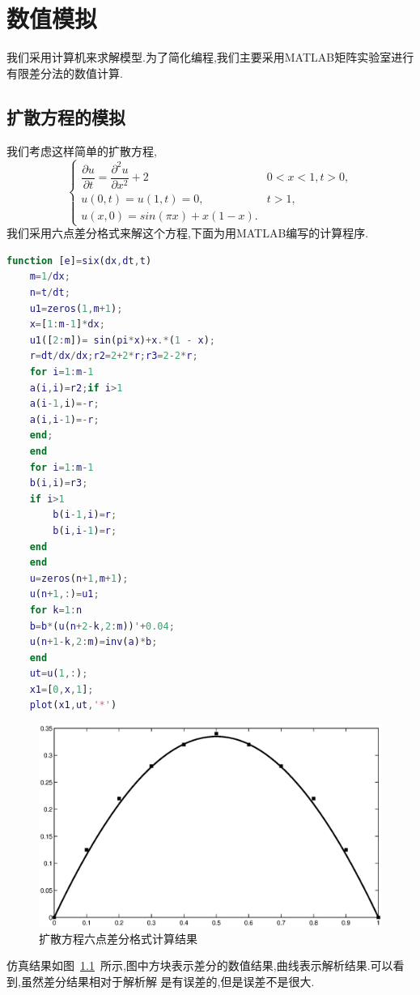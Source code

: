 \chapter{数值模拟}
我们采用计算机来求解模型.为了简化编程,我们主要采用MATLAB矩阵实验室进行有限差分法的数值计算.\par
\section{扩散方程的模拟}
我们考虑这样简单的扩散方程,
\begin{equation}
\begin{cases}
\dfrac{\partial u}{\partial t}=\dfrac{\partial^2 u}{\partial x^2}+2 & 0<x<1,t>0, \\
u(0,t)=u(1,t)=0,& t>1, \\
u(x,0)=sin(\pi x)+x(1-x).
\end{cases}
\end{equation}
我们采用六点差分格式来解这个方程,下面为用MATLAB编写的计算程序.
 \begin{lstlisting}[caption=六点差分格式,language=Matlab]
function [e]=six(dx,dt,t)
    m=1/dx;
    n=t/dt;
    u1=zeros(1,m+1);
    x=[1:m-1]*dx;
    u1([2:m])= sin(pi*x)+x.*(1 - x);
    r=dt/dx/dx;r2=2+2*r;r3=2-2*r;
    for i=1:m-1
	a(i,i)=r2;if i>1
	a(i-1,i)=-r;
	a(i,i-1)=-r;
	end;
    end
    for i=1:m-1
	b(i,i)=r3;
	if i>1
	    b(i-1,i)=r;
	    b(i,i-1)=r;
	end
    end
    u=zeros(n+1,m+1);
    u(n+1,:)=u1;
    for k=1:n
	b=b*(u(n+2-k,2:m))'+0.04;
	u(n+1-k,2:m)=inv(a)*b;
    end
    ut=u(1,:);
    x1=[0,x,1];
    plot(x1,ut,'*')
\end{lstlisting}
\begin{figure}[h]
 \centering
 \includegraphics[scale=0.65]{./pic/6dcf.eps}
 \caption{扩散方程六点差分格式计算结果\label{fig:sm_ldcf}}
\end{figure}\par
仿真结果如图~\ref{fig:sm_ldcf}~所示,图中方块表示差分的数值结果,曲线表示解析结果.可以看到,虽然差分结果相对于解析解
是有误差的,但是误差不是很大.\newpage
